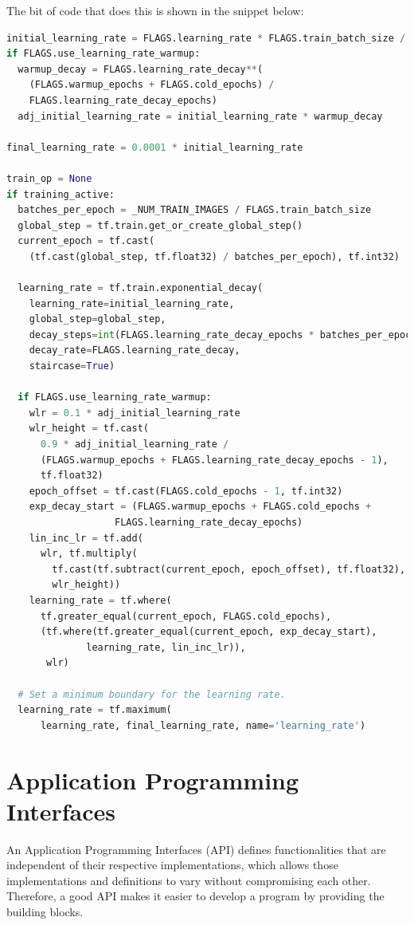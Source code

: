 \documentclass[14pt]{report}
\begin{document}
				The bit of code that does this is shown in the snippet below:\\
				\begin{lstlisting}[language=Python]
initial_learning_rate = FLAGS.learning_rate * FLAGS.train_batch_size / 256
if FLAGS.use_learning_rate_warmup:
  warmup_decay = FLAGS.learning_rate_decay**(
    (FLAGS.warmup_epochs + FLAGS.cold_epochs) /
    FLAGS.learning_rate_decay_epochs)
  adj_initial_learning_rate = initial_learning_rate * warmup_decay

final_learning_rate = 0.0001 * initial_learning_rate

train_op = None
if training_active:
  batches_per_epoch = _NUM_TRAIN_IMAGES / FLAGS.train_batch_size
  global_step = tf.train.get_or_create_global_step()
  current_epoch = tf.cast(
    (tf.cast(global_step, tf.float32) / batches_per_epoch), tf.int32)

  learning_rate = tf.train.exponential_decay(
    learning_rate=initial_learning_rate,
    global_step=global_step,
    decay_steps=int(FLAGS.learning_rate_decay_epochs * batches_per_epoch),
    decay_rate=FLAGS.learning_rate_decay,
    staircase=True)

  if FLAGS.use_learning_rate_warmup:
    wlr = 0.1 * adj_initial_learning_rate
    wlr_height = tf.cast(
      0.9 * adj_initial_learning_rate /
      (FLAGS.warmup_epochs + FLAGS.learning_rate_decay_epochs - 1),
      tf.float32)
    epoch_offset = tf.cast(FLAGS.cold_epochs - 1, tf.int32)
    exp_decay_start = (FLAGS.warmup_epochs + FLAGS.cold_epochs +
                   FLAGS.learning_rate_decay_epochs)
    lin_inc_lr = tf.add(
      wlr, tf.multiply(
        tf.cast(tf.subtract(current_epoch, epoch_offset), tf.float32),
        wlr_height))
    learning_rate = tf.where(
      tf.greater_equal(current_epoch, FLAGS.cold_epochs),
      (tf.where(tf.greater_equal(current_epoch, exp_decay_start),
              learning_rate, lin_inc_lr)),
       wlr)

  # Set a minimum boundary for the learning rate.
  learning_rate = tf.maximum(
      learning_rate, final_learning_rate, name='learning_rate')
				\end{lstlisting}
	
		\section{Application Programming Interfaces}
			An Application Programming Interfaces (API) defines functionalities that are independent of their respective implementations, which allows those implementations and definitions to vary without compromising each other. Therefore, a good API makes it easier to develop a program by providing the building blocks.\\
\end{document}
